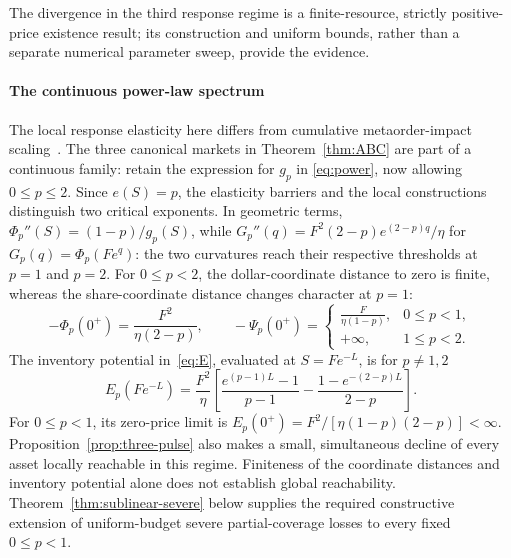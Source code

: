 \documentclass[review,hidelinks,onefignum,onetabnum]{siamonline250211}
\begin{document}
The divergence in the third response regime is a finite-resource, strictly positive-price existence result; its construction and uniform bounds, rather than a separate numerical parameter sweep, provide the evidence.

\paragraph{The continuous power-law spectrum}
The local response elasticity here differs from cumulative metaorder-impact scaling~\citep{BucciEtAl2019,KyleObizhaeva2023}. The three canonical markets in Theorem~\ref{thm:ABC} are part of a
continuous family: retain the expression for $g_p$ in
\eqref{eq:power}, now allowing $0\le p\le2$. Since $e(S)=p$,
the elasticity barriers and the local constructions distinguish
two critical exponents. In geometric terms,
$\Phi_p''(S)=(1-p)/g_p(S)$, while
$G_p''(q)=F^2(2-p)e^{(2-p)q}/\eta$ for
$G_p(q)=\Phi_p(Fe^q)$: the two curvatures reach their
respective thresholds at $p=1$ and $p=2$.
For $0\le p<2$, the dollar-coordinate
distance to zero is finite, whereas the share-coordinate distance
changes character at $p=1$:
\[
-\Phi_p(0^+)=\frac{F^2}{\eta(2-p)},\qquad
-\Psi_p(0^+)=
\begin{cases}
\displaystyle\frac{F}{\eta(1-p)},&0\le p<1,\\[3pt]
+\infty,&1\le p<2.
\end{cases}
\]
The inventory potential in~\eqref{eq:E}, evaluated at
$S=Fe^{-L}$, is for $p\ne1,2$
\[
E_p(Fe^{-L})=\frac{F^2}{\eta}
\left[\frac{e^{(p-1)L}-1}{p-1}
-\frac{1-e^{-(2-p)L}}{2-p}\right].
\]
For $0\le p<1$, its zero-price limit is
$E_p(0^+)=F^2/[\eta(1-p)(2-p)]<\infty$.
Proposition~\ref{prop:three-pulse} also makes a small, simultaneous
decline of every asset locally reachable in this regime.
Finiteness of the coordinate distances and inventory potential
alone does not establish global reachability. Theorem~\ref{thm:sublinear-severe}
below supplies the required constructive extension of uniform-budget
severe partial-coverage losses to every fixed $0\le p<1$.
\end{document}

